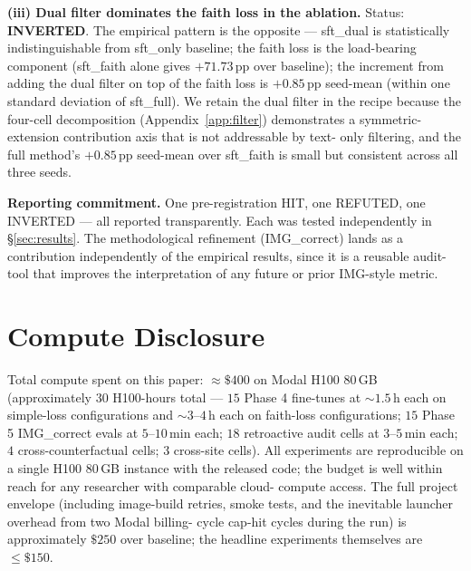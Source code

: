 \documentclass{article}
\begin{document}
\textbf{(iii) Dual filter dominates the faith loss in the ablation.}
Status: \textbf{INVERTED}. The empirical pattern is the opposite ---
sft\_dual is statistically indistinguishable from sft\_only baseline; the
faith loss is the load-bearing component (sft\_faith alone gives
$+71.73$\,pp over baseline); the increment from adding the dual filter on
top of the faith loss is $+0.85$\,pp seed-mean (within one standard
deviation of sft\_full). We retain the dual filter in the recipe because
the four-cell decomposition (Appendix~\ref{app:filter}) demonstrates a
symmetric-extension contribution axis that is not addressable by text-
only filtering, and the full method's $+0.85$\,pp seed-mean over
sft\_faith is small but consistent across all three seeds.

\textbf{Reporting commitment.} One pre-registration HIT, one REFUTED,
one INVERTED --- all reported transparently. Each was tested
independently in \S\ref{sec:results}. The methodological refinement
(IMG\_correct) lands as a contribution independently of the empirical
results, since it is a reusable audit-tool that improves the
interpretation of any future or prior IMG-style metric.

\section{Compute Disclosure}
\label{app:compute}

Total compute spent on this paper: $\approx \$400$ on Modal H100 80\,GB
(approximately $30$ H100-hours total --- $15$ Phase 4 fine-tunes at
$\sim 1.5$\,h each on simple-loss configurations and $\sim 3$--$4$\,h
each on faith-loss configurations; $15$ Phase 5 IMG\_correct evals at
$5$--$10$\,min each; $18$ retroactive audit cells at $3$--$5$\,min each;
$4$ cross-counterfactual cells; $3$ cross-site cells). All experiments are
reproducible on a single H100 $80$\,GB instance with the released code;
the budget is well within reach for any researcher with comparable cloud-
compute access. The full project envelope (including image-build retries,
smoke tests, and the inevitable launcher overhead from two Modal billing-
cycle cap-hit cycles during the run) is approximately $\$250$ over
baseline; the headline experiments themselves are $\le \$150$.
\end{document}
